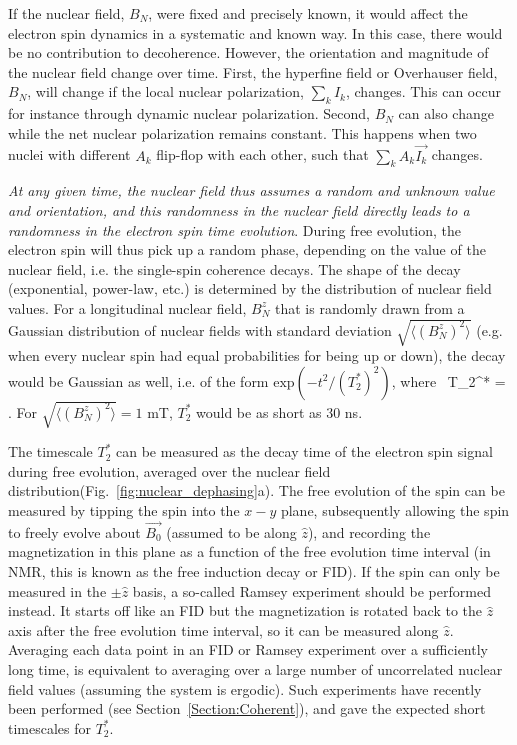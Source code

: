 \documentclass[12pt,aps,nofootinbib]{revtex4-1}
\begin{document}
If the nuclear field, $B_N$, were fixed and precisely
known, it would affect the electron spin dynamics in a systematic
and known way. In this case, there would be no contribution to
decoherence. However, the orientation and magnitude of the nuclear
field change over time. First, the hyperfine field or Overhauser
field, $B_N$, will change if the local nuclear polarization,
$\sum_k I_k$, changes. This can occur for instance through dynamic 
nuclear polarization. Second, $B_N$ can also change while the net 
nuclear polarization remains
constant. This happens when two nuclei with different $A_k$
flip-flop with each other, such that $\sum_k A_k \vec{I_k}$
changes.

\emph{At any given time, the nuclear field thus assumes a random
and unknown value and orientation, and this randomness in the
nuclear field directly leads to a randomness in the electron spin
time evolution}. During free evolution, the electron spin will
thus pick up a random phase, depending on the value of the nuclear
field, i.e. the single-spin coherence decays. The shape of the decay (exponential, power-law, etc.) is determined by the distribution of nuclear field values. For a longitudinal nuclear field, $B_N^z$ that is randomly
drawn from a Gaussian distribution of nuclear fields with standard
deviation $\sqrt{\langle(B_N^z)^2\rangle}$ (e.g. when every
nuclear spin had equal probabilities for being up or down), the decay would be Gaussian as well, i.e. of the form $\mbox{exp}(-t^2/(T_2^*)^2)$, where~\cite{merkulov02} 
\be
T_2^* =  \;.
\ee 
For $\sqrt{\langle(B_N^z)^2\rangle} = 1$ mT, $T_2^*$ would be as short as $30$ ns. 

The timescale $T_2^*$ can be measured as the decay time of the electron spin signal during free evolution, averaged over the nuclear field distribution(Fig.~\ref{fig:nuclear_dephasing}a). The free evolution of the spin can be measured by tipping the spin into the $x-y$ plane, subsequently allowing the spin to freely evolve about $\vec{B_0}$ (assumed to be along $\hat{z}$), and recording the magnetization in this plane as a function of the free evolution time interval (in NMR, this is known as the free induction decay or FID).  If the spin can only be measured in the $\pm\hat{z}$ basis, a so-called Ramsey experiment should be performed instead. It starts off like an FID but the magnetization is rotated back to the $\hat{z}$ axis after the free evolution time interval, so it can be measured along $\hat{z}$. Averaging each data point in an FID or Ramsey experiment over a sufficiently long time, is equivalent to averaging over a large number of uncorrelated nuclear field values (assuming the system is ergodic). Such experiments have recently been performed (see Section~\ref{Section:Coherent}), and gave the expected short timescales for $T_2^*$.
\end{document}
